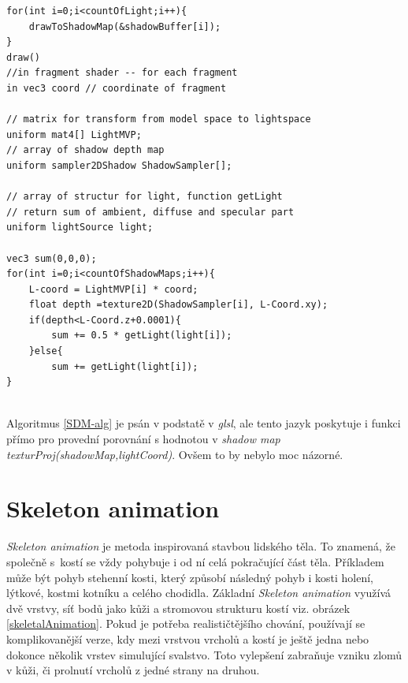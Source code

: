 \lstset{frame = single, language=C++, framexleftmargin=15pt,label="Algoritmus"}

\begin{lstlisting}[caption=Algoritmus Shadow depth map]
for(int i=0;i<countOfLight;i++){
	drawToShadowMap(&shadowBuffer[i]);
}
draw()
//in fragment shader -- for each fragment
in vec3 coord // coordinate of fragment

// matrix for transform from model space to lightspace
uniform mat4[] LightMVP;	
// array of shadow depth map
uniform sampler2DShadow ShadowSampler[];

// array of structur for light, function getLight
// return sum of ambient, diffuse and specular part
uniform lightSource light;

vec3 sum(0,0,0);
for(int i=0;i<countOfShadowMaps;i++){
	L-coord = LightMVP[i] * coord;
	float depth =texture2D(ShadowSampler[i], L-Coord.xy);
	if(depth<L-Coord.z+0.0001){
		sum += 0.5 * getLight(light[i]);
	}else{
		sum += getLight(light[i]);	
}
	
\end{lstlisting}\label{SDM-alg}
Algoritmus \ref{SDM-alg} je psán v podstatě v \emph{glsl}, ale tento jazyk poskytuje i funkci přímo pro provední porovnání s hodnotou v \emph{shadow map} \emph{texturProj(shadowMap,lightCoord)}. Ovšem to by nebylo moc názorné.
\section{Skeleton animation}\label{SA}
\emph{Skeleton animation }je metoda inspirovaná stavbou lidského těla. To znamená, že společně s~kostí se vždy pohybuje i od ní celá pokračující část těla. Příkladem může být pohyb stehenní kosti, který způsobí následný pohyb i kosti holení, lýtkové, kostmi kotníku a celého chodidla. Základní \emph{Skeleton animation} využívá dvě vrstvy, síť bodů jako kůži a stromovou strukturu kostí viz. obrázek \ref{skeletalAnimation}.
Pokud je potřeba realističtějšího chování, používají se komplikovanější verze, kdy mezi vrstvou vrcholů a kostí je ještě jedna nebo dokonce několik vrstev simulující svalstvo. Toto vylepšení zabraňuje vzniku zlomů v kůži, či prolnutí vrcholů z jedné strany na druhou.

